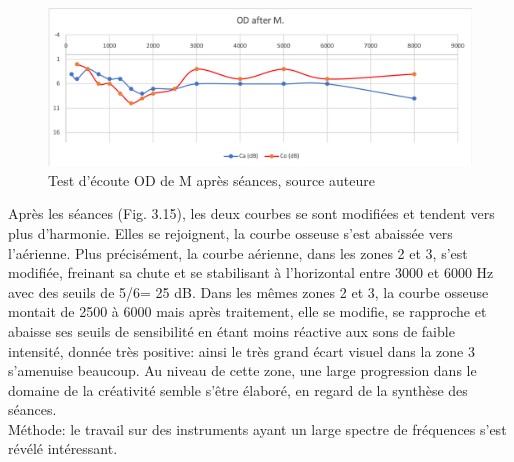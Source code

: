\begin{figure}[tbh]
	\centering
	
	\includegraphics[width=0.7\linewidth]{images/clinique/od_after_m.png}
	\caption[Test d'écoute de M après séances, OD]{Test d'écoute OD de M après séances, 
		source auteure}
	\label{fig:odaftermeyer}
\end{figure}
Après les séances (Fig. 3.15), les deux courbes se sont modifiées et tendent vers plus d'harmonie.
Elles se rejoignent, la courbe osseuse s'est abaissée vers l'aérienne.
 Plus précisément, la courbe aérienne, dans les
zones 2 et 3,  s'est modifiée, freinant sa
chute et se stabilisant à l'horizontal entre 3000 et 6000 Hz
avec des seuils de 5/6= 25 dB.
Dans les mêmes zones 2 et 3, la
courbe osseuse montait de 2500 à 6000 mais après traitement,
elle se modifie, se rapproche et abaisse ses seuils de
sensibilité en étant moins réactive aux sons de faible
intensité, donnée très positive: ainsi le très grand écart visuel dans la zone 3 s'amenuise beaucoup. Au 
niveau de cette
zone, une large progression dans
le domaine de la créativité semble s'être élaboré, en regard de la synthèse des séances. 
\\
 Méthode:  le travail sur des instruments ayant un large spectre de fréquences s'est révélé intéressant. 
